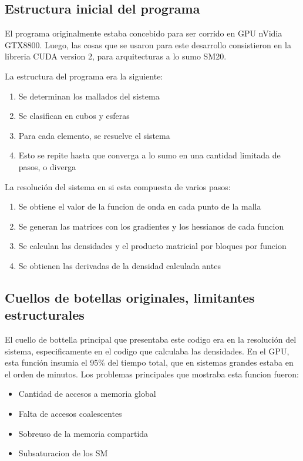 
\subsection{Estructura inicial del programa}

El programa originalmente estaba concebido para ser corrido en GPU nVidia GTX8800.
Luego, las cosas que se usaron para este desarrollo consistieron en la libreria CUDA version
2, para arquitecturas a lo sumo SM20.

La estructura del programa era la siguiente:
\begin{enumerate}
\item Se determinan los mallados del sistema
\item Se clasifican en cubos y esferas
\item Para cada elemento, se resuelve el sistema
\item Esto se repite hasta que converga a lo sumo en una cantidad limitada de pasos, o diverga
\end{enumerate}

La resoluci\'on del sistema en si esta compuesta de varios pasos:
\begin{enumerate}
\item Se obtiene el valor de la funcion de onda en cada punto de la malla
\item Se generan las matrices con los gradientes y los hessianos de cada funcion
\item Se calculan las densidades y el producto matricial por bloques por funcion
\item Se obtienen las derivadas de la densidad calculada antes
\end{enumerate}


\subsection{Cuellos de botellas originales, limitantes estructurales}

El cuello de bottella principal que presentaba este codigo era en la 
resoluci\'on del sistema, especificamente en el codigo que calculaba las densidades. 
En el GPU, esta funci\'on insumia el 95\% del tiempo total, que en sistemas grandes estaba
en el orden de minutos. Los problemas principales que mostraba esta funcion fueron:
\begin{itemize}
\item Cantidad de accesos a memoria global
\item Falta de accesos coalescentes
\item Sobreuso de la memoria compartida
\item Subsaturacion de los SM
\end{itemize}


